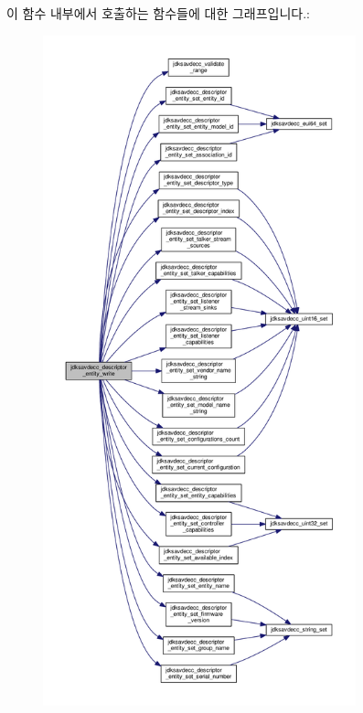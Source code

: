 이 함수 내부에서 호출하는 함수들에 대한 그래프입니다.\+:
\nopagebreak
\begin{figure}[H]
\begin{center}
\leavevmode
\includegraphics[height=550pt]{group__descriptor__entity_ga5b144b7a8ef89d27ddbd5c2b7a4c4b59_cgraph}
\end{center}
\end{figure}


